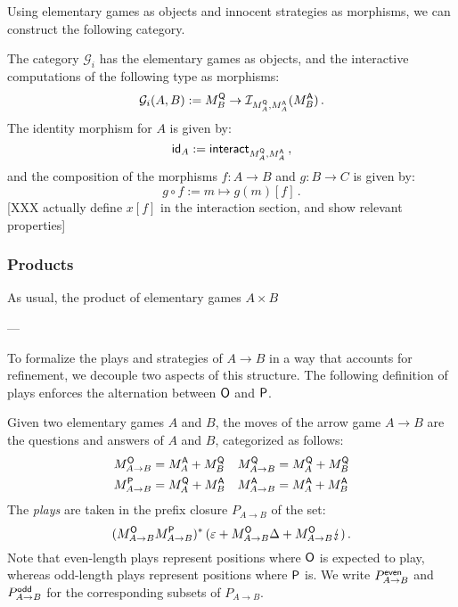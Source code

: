 Using elementary games as objects and innocent strategies as morphisms,
we can construct the following category.

\begin{definition}
The category $\mathcal{G}_i$
has the elementary games as objects,
and the interactive computations of the following type as morphisms:
\[
  \mathcal{G}_i(A, B) :=
  M_B^{ \mathsf{Q} } \rightarrow \mathcal{I}_{M_A^{ \mathsf{Q} },M_A^{ \mathsf{A} }}(M_B^{ \mathsf{A} }) \,.
\]
The identity morphism for $A$ is given by:
\[
   \mathsf{id} _A :=  \mathsf{interact} _{M_A^{ \mathsf{Q} },M_A^{ \mathsf{A} }} \,,
\]
and the composition of the morphisms
$f : A \rightarrow B$ and
$g : B \rightarrow C$
is given by:
\[
  g \circ f := m \mapsto g(m)[f] \,.
\]
[XXX actually define $x[f]$
in the interaction section,
and show relevant properties]
\end{definition}


\subsubsection{Products} %

As usual,
the product of elementary games $A \times B$




---

To formalize the plays and strategies of $A \rightarrow B$
in a way that accounts for refinement,
we decouple two aspects of this structure.
The following definition of plays
enforces the alternation between $ \mathsf{O} $ and $ \mathsf{P} $.

\begin{definition} %
Given two elementary games $A$ and $B$,
the moves of the arrow game $A \rightarrow B$
are the questions and answers of $A$ and $B$,
categorized as follows:
\begin{align*}
  M_{A \rightarrow B}^{ \mathsf{O} } &= M_A^{ \mathsf{A} } + M_B^{ \mathsf{Q} } &
  M_{A \rightarrow B}^{ \mathsf{Q} } &= M_A^{ \mathsf{Q} } + M_B^{ \mathsf{Q} } \\
  M_{A \rightarrow B}^{ \mathsf{P} } &= M_A^{ \mathsf{Q} } + M_B^{ \mathsf{A} } &
  M_{A \rightarrow B}^{ \mathsf{A} } &= M_A^{ \mathsf{A} } + M_B^{ \mathsf{A} }
\end{align*}
The \emph{plays} are taken in
the prefix closure $P_{A \rightarrow B}$ of the set:
\[
    (M_{A \rightarrow B}^{ \mathsf{O} }
     M_{A \rightarrow B}^{ \mathsf{P} })^* \,
    (\varepsilon +
     M_{A \rightarrow B}^{ \mathsf{O} } \Delta +
     M_{A \rightarrow B}^{ \mathsf{O} } \lightning) \,.
\]
Note that
even-length plays represent positions where $ \mathsf{O} $ is expected to play,
whereas odd-length plays represent positions where $ \mathsf{P} $ is.
We write $P_{A \rightarrow B}^{ \mathsf{even} }$ and $P_{A \rightarrow B}^{ \mathsf{odd} }$
for the corresponding subsets of $P_{A \rightarrow B}$.
\end{definition}

